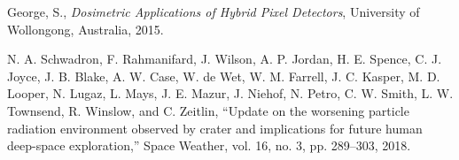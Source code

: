 \begin{thebibliography}{9}
  George, S., \textit{Dosimetric Applications of Hybrid Pixel Detectors}, University of Wollongong, Australia, 2015.

N. A. Schwadron, F. Rahmanifard, J. Wilson, A. P. Jordan, H. E. Spence, C. J. Joyce, J. B.
Blake, A. W. Case, W. de Wet, W. M. Farrell, J. C. Kasper, M. D. Looper, N. Lugaz, L. Mays,
J. E. Mazur, J. Niehof, N. Petro, C. W. Smith, L. W. Townsend, R. Winslow, and C. Zeitlin,
“Update on the worsening particle radiation environment observed by crater and implications
for future human deep-space exploration,” Space Weather, vol. 16, no. 3, pp. 289–303, 2018.







  
  

  

  

	

\end{thebibliography}
